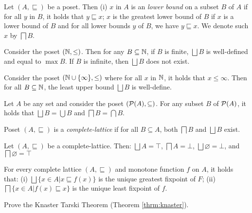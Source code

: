 \begin{definition}
    Let $(A,\sqsubseteq)$ be a poset. Then (i) $x$ in $A$ is an \emph{lower bound} on a subset $B$ of $A$ if for all $y$ in $B$, it holds that $y \sqsubseteq x$; $x$ is the greatest lower bound of $B$ if $x$ is a lower bound of $B$ and for all lower bounds $y$ of $B$, we have $y \sqsubseteq x$. We denote such $x$ by $\bigsqcap B$.
\end{definition}

\begin{example} 
    Consider the poset $(\mathbb{N},\leq)$. Then for any $B \subseteq \mathbb{N}$, if $B$ is finite, $\bigsqcup B$ is well-defined and equal to $\max B$. If $B$ is infinite, then $\bigsqcup B$ does not exist. 
\end{example}

\begin{example} 
   Consider the poset $(\mathbb{N} \cup \{\infty\},\leq)$ where for all $x$ in $\mathbb{N}$, it holds that $x \leq \infty$. Then for all $B \subseteq \mathbb{N}$, the least upper bound $\bigsqcup B$ is well-define. 
\end{example}

\begin{example} 
    Let $A$ be any set and consider the poset $(\mathcal{P}(A),\subseteq)$. For any subset $B$ of $\mathcal{P}(A)$, it holds that $\bigsqcup B = \bigcup B$ and $\bigsqcap B = \bigcap B$. 
\end{example}


\begin{definition}
    Poset $(A,\sqsubseteq)$ is a \emph{complete-lattice} if for all $B \subseteq A$, both $\bigsqcap B$ and $\bigsqcup B$ exist.
\end{definition}
\begin{example}
    Let $(A,\sqsubseteq)$ be a complete-lattice. Then: $\bigsqcup A = \top$, $\bigsqcap A = \bot$, $\bigsqcup \varnothing = \bot$, and $\bigsqcap \varnothing = \top$
\end{example}





\begin{theorem}
\label{thrm:knaster}
    For every complete lattice $(A,\sqsubseteq)$ and monotone function $f$ on $A$, it holds that: (i) $\bigsqcup \{x\in A| x \sqsubseteq f(x)\}$ is the unique greatest fixpoint of $F$; (ii) $\bigsqcap \{x \in A| f(x) \sqsubseteq x\}$ is the unique least fixpoint of $f$. 
\end{theorem}


\begin{exercise}
        Prove the Knaster Tarski Theorem (Theorem \ref{thrm:knaster}).
\end{exercise}


